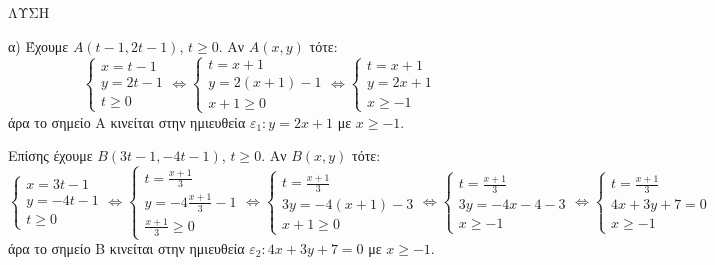 \noindent ΛΥΣΗ

\noindent α) Έχουμε $A(t-1, 2t-1)$, $t \ge 0$. Αν $A(x, y)$ τότε:
\[
\begin{cases}
x = t-1 \\
y = 2t-1 \\
t \ge 0
\end{cases}
\Leftrightarrow
\begin{cases}
t = x+1 \\
y = 2(x+1)-1 \\
x+1 \ge 0
\end{cases}
\Leftrightarrow
\begin{cases}
t = x+1 \\
y = 2x+1 \\
x \ge -1
\end{cases}
\]
άρα το σημείο Α κινείται στην ημιευθεία $\varepsilon_1: y = 2x + 1$ με $x \ge -1$.

Επίσης έχουμε $B(3t-1, -4t-1)$, $t \ge 0$. Αν $B(x, y)$ τότε:
\[
\begin{cases}
x = 3t-1 \\
y = -4t-1 \\
t \ge 0
\end{cases}
\Leftrightarrow
\begin{cases}
t = \frac{x+1}{3} \\
y = -4\frac{x+1}{3}-1 \\
\frac{x+1}{3} \ge 0
\end{cases}
\Leftrightarrow
\begin{cases}
t = \frac{x+1}{3} \\
3y = -4(x+1)-3 \\
x+1 \ge 0
\end{cases}
\Leftrightarrow
\begin{cases}
t = \frac{x+1}{3} \\
3y = -4x-4-3 \\
x \ge -1
\end{cases}
\Leftrightarrow
\begin{cases}
t = \frac{x+1}{3} \\
4x+3y+7 = 0 \\
x \ge -1
\end{cases}
\]
άρα το σημείο Β κινείται στην ημιευθεία $\varepsilon_2: 4x + 3y + 7 = 0$ με $x \ge -1$.

